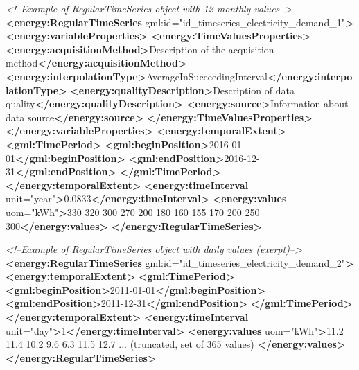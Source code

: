 \documentclass[a4paper,12pt]{article}
\newenvironment{Shaded}{}{}
\newcommand{\KeywordTok}[1]{\textcolor[rgb]{0.00,0.44,0.13}{\textbf{{#1}}}}
\newcommand{\StringTok}[1]{\textcolor[rgb]{0.25,0.44,0.63}{{#1}}}
\newcommand{\CommentTok}[1]{\textcolor[rgb]{0.38,0.63,0.69}{\textit{{#1}}}}
\newcommand{\OtherTok}[1]{\textcolor[rgb]{0.00,0.44,0.13}{{#1}}}
\newcommand{\NormalTok}[1]{{#1}}
\begin{document}
\begin{Shaded}
\begin{Highlighting}[]
\CommentTok{<!--Example of RegularTimeSeries object with 12 monthly values-->}
\KeywordTok{<energy:RegularTimeSeries}\OtherTok{ gml:id=}\StringTok{"id_timeseries_electricity_demand_1"}\KeywordTok{>}
    \KeywordTok{<energy:variableProperties>}
        \KeywordTok{<energy:TimeValuesProperties>}
            \KeywordTok{<energy:acquisitionMethod>}\NormalTok{Description of the acquisition method}\KeywordTok{</energy:acquisitionMethod>}
            \KeywordTok{<energy:interpolationType>}\NormalTok{AverageInSucceedingInterval}\KeywordTok{</energy:interpolationType>}
            \KeywordTok{<energy:qualityDescription>}\NormalTok{Description of data quality}\KeywordTok{</energy:qualityDescription>}
            \KeywordTok{<energy:source>}\NormalTok{Information about data source}\KeywordTok{</energy:source>}
        \KeywordTok{</energy:TimeValuesProperties>}
    \KeywordTok{</energy:variableProperties>}
    \KeywordTok{<energy:temporalExtent>}
        \KeywordTok{<gml:TimePeriod>}
            \KeywordTok{<gml:beginPosition>}\NormalTok{2016-01-01}\KeywordTok{</gml:beginPosition>}
            \KeywordTok{<gml:endPosition>}\NormalTok{2016-12-31}\KeywordTok{</gml:endPosition>}
        \KeywordTok{</gml:TimePeriod>}
    \KeywordTok{</energy:temporalExtent>}
    \KeywordTok{<energy:timeInterval}\OtherTok{ unit=}\StringTok{"year"}\KeywordTok{>}\NormalTok{0.0833}\KeywordTok{</energy:timeInterval>}
    \KeywordTok{<energy:values}\OtherTok{ uom=}\StringTok{"kWh"}\KeywordTok{>}\NormalTok{330 320 300 270 200 180 160 155 170 200 250 300}\KeywordTok{</energy:values>}
\KeywordTok{</energy:RegularTimeSeries>}
\end{Highlighting}
\end{Shaded}

\begin{Shaded}
\begin{Highlighting}[]
\CommentTok{<!--Example of RegularTimeSeries object with daily values (exerpt)-->}
\KeywordTok{<energy:RegularTimeSeries}\OtherTok{ gml:id=}\StringTok{"id_timeseries_electricity_demand_2"}\KeywordTok{>}
    \KeywordTok{<energy:temporalExtent>}
        \KeywordTok{<gml:TimePeriod>}
            \KeywordTok{<gml:beginPosition>}\NormalTok{2011-01-01}\KeywordTok{</gml:beginPosition>}
            \KeywordTok{<gml:endPosition>}\NormalTok{2011-12-31}\KeywordTok{</gml:endPosition>}
        \KeywordTok{</gml:TimePeriod>}
    \KeywordTok{</energy:temporalExtent>}
    \KeywordTok{<energy:timeInterval}\OtherTok{ unit=}\StringTok{"day"}\KeywordTok{>}\NormalTok{1}\KeywordTok{</energy:timeInterval>}
    \KeywordTok{<energy:values}\OtherTok{ uom=}\StringTok{"kWh"}\KeywordTok{>}\NormalTok{11.2 11.4 10.2 9.6 6.3 11.5 12.7 ... (truncated, set of 365 values) }\KeywordTok{</energy:values>}
\KeywordTok{</energy:RegularTimeSeries>}
\end{Highlighting}
\end{Shaded}
\end{document}
